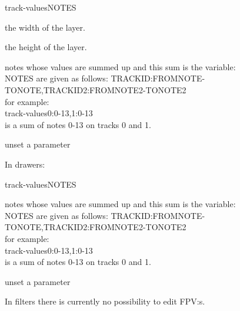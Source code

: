 \documentclass{article}
\begin{document}
      \begin{labeling}{track-valuesNOTES}
        \item[layer-width]       the width of the layer. 
        \item[layer-height]      the height of the layer. 
        \item[track-valuesNOTES] notes whose values are summed up and this sum is the variable: \\
                                 NOTES are given as follows:
                                 TRACKID:FROMNOTE-TONOTE,TRACKID2:FROMNOTE2-TONOTE2 \\
                                 for example: \\
                                 track-values0:0-13,1:0-13 \\ 
                                 is a sum of notes 0-13 on tracks 0 and 1.
        \item[null]              unset a parameter\\
      \end{labeling}
      In drawers: \\
      \begin{labeling}{track-valuesNOTES}
        \item[track-valuesNOTES] notes whose values are summed up and this sum is the variable: \\
                                 NOTES are given as follows:
                                 TRACKID:FROMNOTE-TONOTE,TRACKID2:FROMNOTE2-TONOTE2 \\
                                 for example: \\
                                 track-values0:0-13,1:0-13 \\ 
                                 is a sum of notes 0-13 on tracks 0 and 1.
        \item[null]              unset a parameter\\
      \end{labeling}
      In filters there is currently no possibility to edit FPV:s.
      
\end{document}
